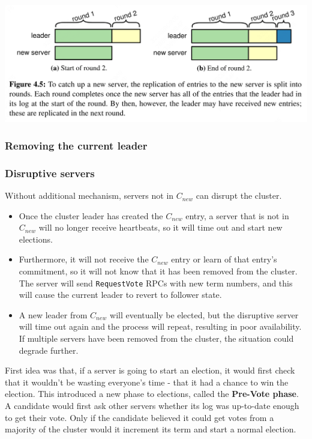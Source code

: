 \documentclass[11pt]{article}
\begin{document}
\begin{center}
\includegraphics[width=.99\textwidth]{../../images/papers/19.png}
\label{4.5}
\end{center}
\subsubsection{Removing the current leader}
\label{sec:org800d84b}
\subsubsection{Disruptive servers}
\label{sec:org05a34cc}
Without additional mechanism, servers not in \(C_{new}\) can disrupt the cluster.
\begin{itemize}
\item Once the cluster leader has created the \(C_{new}\) entry, a server that is not in \(C_{new}\) will
no longer receive heartbeats, so it will time out and start new elections.
\item Furthermore, it will not receive the \(C_{new}\) entry or learn of that entry’s commitment, so it
will not know that it has been removed from the cluster. The server will send \texttt{RequestVote} RPCs with
new term numbers, and this will cause the current leader to revert to follower state.
\item A new leader from \(C_{new}\) will eventually be elected, but the disruptive server will time out
again and the process will repeat, resulting in poor availability. If multiple servers have been
removed from the cluster, the situation could degrade further.
\end{itemize}


First idea was that, if a server is going to start an election, it would first check that it wouldn't
be wasting everyone's time - that it had a chance to win the election. This introduced a new phase to
elections, called the \textbf{Pre-Vote phase}. A candidate would first ask other servers whether its log was
up-to-date enough to get their vote. Only if the candidate believed it could get votes from a majority
of the cluster would it increment its term and start a normal election.
\end{document}
